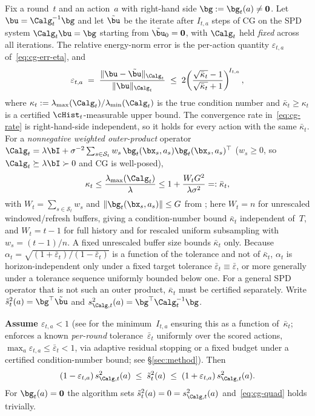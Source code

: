 \begin{lemma}\label{lem:cg}
Fix a round~$t$ and an action~$a$ with right-hand side
$\bg:=\bg_t(a)\ne\mathbf0$.  Let $\bu = \Calg_t^{-1}\bg$ and let $\tilde\bu$ be
the iterate after $I_{t,a}$ steps of CG on the SPD system $\Calg_t\bu=\bg$
starting from $\tilde\bu_0=\mathbf{0}$, with $\Calg_t$ held \emph{fixed} across
all iterations.  The relative energy-norm error is the per-action quantity
$\varepsilon_{t,a}$ of~\eqref{eq:cg-err-eta}, and
\begin{equation}\label{eq:cg-rate}
  \varepsilon_{t,a}
  \;=\;
  \frac{\|\bu-\tilde\bu\|_{\Calg_t}}{\|\bu\|_{\Calg_t}}
  \;\le\;
  2\!\left(\frac{\sqrt{\bar\kappa_t}-1}{\sqrt{\bar\kappa_t}+1}\right)^{\!I_{t,a}},
\end{equation}
where
$\kappa_t:=\lambda_{\max}(\Calg_t)/\lambda_{\min}(\Calg_t)$ is the true
condition number and $\bar\kappa_t\ge\kappa_t$ is a certified
$\cHist_t$-measurable upper bound.  The convergence rate in~\eqref{eq:cg-rate} is right-hand-side
independent, so it holds for every action with the same $\bar\kappa_t$.
For a \emph{nonnegative weighted outer-product} operator
$\Calg_t=\lambda\bI+\sigma^{-2}\sum_{s\in\mathcal{S}_t}w_s\,
\bg_t(\bx_s,a_s)\bg_t(\bx_s,a_s)^\top$ ($w_s\ge0$, so
$\Calg_t\succeq\lambda\bI\succ0$ and CG is well-posed),
\[
\kappa_t\le\frac{\lambda_{\max}(\Calg_t)}{\lambda}
\le1+\frac{W_tG^2}{\lambda\sigma^2}=: \bar\kappa_t,
\]
with $W_t=\sum_{s\in\mathcal{S}_t}w_s$ and
$\|\bg_t(\bx_s,a_s)\|\le G$ from ; here $W_t=n$ for unrescaled
windowed/refresh buffers, giving a condition-number bound $\bar\kappa_t$
independent of~$T$, and $W_t=t{-}1$ for full history and for rescaled uniform
subsampling with $w_s=(t{-}1)/n$.  A fixed unrescaled buffer size bounds
$\bar\kappa_t$ only.  Because
$\alpha_t=\sqrt{(1+\bar\varepsilon_t)/(1-\bar\varepsilon_t)}$ is a function of
the tolerance and not of $\bar\kappa_t$, $\alpha_t$ is horizon-independent only
under a fixed target tolerance $\bar\varepsilon_t\equiv\bar\varepsilon$, or more
generally under a tolerance sequence uniformly bounded below one.  For a general
SPD operator that is not such an outer product, $\bar\kappa_t$ must be certified
separately.
Write $\tilde{s}_t^2(a) = \bg^\top\tilde\bu$ and
$s_{\Calg,t}^2(a)=\bg^\top\Calg_t^{-1}\bg$.

\textbf{Assume $\varepsilon_{t,a} < 1$}
(see  for the minimum~$I_{t,a}$ ensuring this as a function
of~$\bar\kappa_t$;
 enforces a known \emph{per-round} tolerance~$\bar\varepsilon_t$
uniformly over the scored actions, $\max_a\varepsilon_{t,a}\le\bar\varepsilon_t<1$,
via adaptive residual stopping or a fixed budget under a certified
condition-number bound; see \S\ref{sec:method}).
Then
\begin{equation}\label{eq:cg-quad}
  (1-\varepsilon_{t,a})\,s_{\Calg,t}^2(a)
  \;\le\;
  \tilde{s}_t^2(a)
  \;\le\;
  (1+\varepsilon_{t,a})\,s_{\Calg,t}^2(a).
\end{equation}
For $\bg_t(a)=\mathbf0$ the algorithm sets
$\tilde{s}_t^2(a)=0=s_{\Calg,t}^2(a)$ and~\eqref{eq:cg-quad} holds trivially.
\end{lemma}


